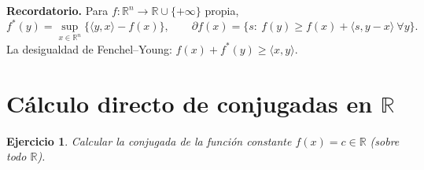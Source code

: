 \documentclass[11pt]{report}
\newtheorem{ex}{Ejercicio}
\newcommand{\R}{\mathbb{R}}
\DeclareMathOperator*{\supx}{sup}
\newcommand{\dom}{\operatorname{dom}}
\newcommand{\epi}{\operatorname{epi}}
\newcommand{\cl}{\operatorname{cl}}
\newcommand{\ri}{\operatorname{ri}}
\newcommand{\indic}{I}
\newcommand{\supp}{\sigma}
\newcommand{\subdiff}{\partial}
\newcommand{\conv}{\operatorname{conv}}
\begin{document}






\noindent\textbf{Recordatorio.} Para $f:\R^n\to\R\cup\{+\infty\}$ propia,
\[
  f^*(y)=\sup_{x\in\R^n}\{\langle y,x\rangle-f(x)\},
  \qquad
  \subdiff f(x)=\{s:\ f(y)\ge f(x)+\langle s,y-x\rangle\ \forall y\}.
\]
La desigualdad de Fenchel--Young: $f(x)+f^*(y)\ge\langle x,y\rangle$.


\section{Cálculo directo de conjugadas en $\R$}

\begin{ex}
Calcular la conjugada de la función constante $f(x)=c\in\R$
(sobre todo $\R$).
\end{ex}
\end{document}

